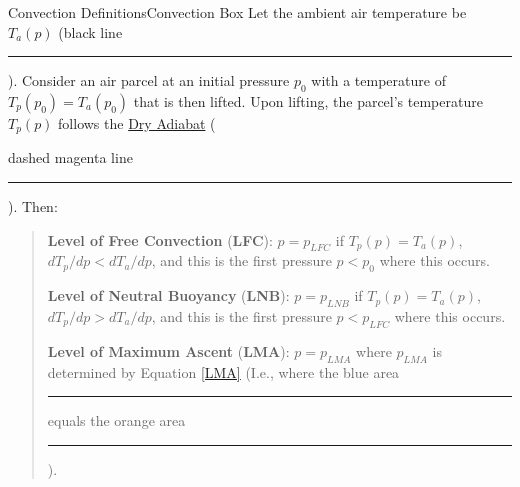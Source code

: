 \begin{fact}{Convection Definitions}{Convection Box}\label{Convection Box}
    Let the ambient air temperature be $T_a(p)$ (black line \textcolor{black}{\rule{0.25cm}{0.25cm}}). Consider an air parcel at an initial pressure $p_0$ with a temperature of $T_p(p_0)=T_a(p_0)$ that is then lifted. Upon lifting, the parcel's temperature $T_p(p)$ follows the \hyperref[Dry Adiabat]{Dry Adiabat} (\textcolor{mymagenta}{dashed magenta line \rule{0.25cm}{0.25cm}}). Then:
    \begin{quote}
        \textbf{Level of Free Convection} (\textbf{LFC}): $p=p_{LFC}$ if $T_p(p)=T_a(p)$, $dT_p/dp<dT_a/dp$, and this is the first pressure $p<p_0$ where this occurs.

        \textbf{Level of Neutral Buoyancy} (\textbf{LNB}): $p=p_{LNB}$ if $T_p(p)=T_a(p)$, $dT_p/dp>dT_a/dp$, and this is the first pressure $p<p_{LFC}$ where this occurs.

        \textbf{Level of Maximum Ascent} (\textbf{LMA}): $p=p_{LMA}$ where $p_{LMA}$ is determined by Equation \ref{LMA} (I.e., where the blue area \textcolor{mydarkblue}{\rule{0.25cm}{0.25cm}} equals the orange area \textcolor{myorange}{\rule{0.25cm}{0.25cm}}).
    \end{quote}


\end{fact}
